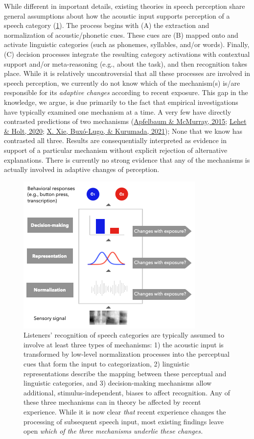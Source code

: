\documentclass[
  11pt,
  english,
  man,floatsintext]{apa6}
\begin{document}
While different in important details, existing theories in speech perception share general assumptions about how the acoustic input supports perception of a speech category (\ref{fig:overview}). The process begins with (A) the extraction and normalization of acoustic/phonetic cues. These cues are (B) mapped onto and activate linguistic categories (such as phonemes, syllables, and/or words). Finally, (C) decision processes integrate the resulting category activations with contextual support and/or meta-reasoning (e.g., about the task), and then recognition takes place. While it is relatively uncontroversial that all these processes are involved in speech perception, we currently do not know which of the mechanism(s) is/are responsible for its \emph{adaptive changes} according to recent exposure. This gap in the knowledge, we argue, is due primarily to the fact that empirical investigations have typically examined one mechanism at a time. A very few have directly contrasted predictions of two mechanisms (\protect\hyperlink{ref-apfelbaum-mcmurray2015}{Apfelbaum \& McMurray, 2015}; \protect\hyperlink{ref-lehet-holt2020}{Lehet \& Holt, 2020}; \protect\hyperlink{ref-xie2021cognition}{X. Xie, Buxó-Lugo, \& Kurumada, 2021}); None that we know has contrasted all three. Results are consequentially interpreted as evidence in support of a particular mechanism without explicit rejection of alternative explanations. There is currently no strong evidence that any of the mechanisms is actually involved in adaptive changes of perception.

\begin{figure}[h]
\begin{center}
\includegraphics[width=0.6\columnwidth]{../figures/diagrams/overview-of-three-mechanisms2.png}
\caption{Listeners' recognition of speech categories are typically assumed to involve at least three types of mechanisms: 1) the acoustic input is transformed by low-level normalization processes into the perceptual cues that form the input to categorization, 2) linguistic representations describe the mapping between these perceptual and linguistic categories, and 3) decision-making mechanisms allow additional, stimulus-independent, biases to affect recognition. Any of these three mechanisms can in theory be affected by recent experience. While it is now clear \emph{that} recent experience changes the processing of subsequent speech input, most existing findings leave open \emph{which of the three mechanisms underlie these changes.}}\label{fig:overview}
\end{center}
\end{figure}
\end{document}
